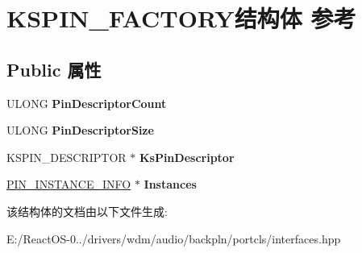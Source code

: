 \hypertarget{struct_k_s_p_i_n___f_a_c_t_o_r_y}{}\section{K\+S\+P\+I\+N\+\_\+\+F\+A\+C\+T\+O\+R\+Y结构体 参考}
\label{struct_k_s_p_i_n___f_a_c_t_o_r_y}
\subsection*{Public 属性}
\begin{DoxyCompactItemize}
\item 
\mbox{\label{struct_k_s_p_i_n___f_a_c_t_o_r_y_a96295da67a350f279e5c657413fafe99}} 
U\+L\+O\+NG {\bfseries Pin\+Descriptor\+Count}
\item 
\mbox{\label{struct_k_s_p_i_n___f_a_c_t_o_r_y_aec70f6dccde8f9519b9b0568a0471dfd}} 
U\+L\+O\+NG {\bfseries Pin\+Descriptor\+Size}
\item 
\mbox{\label{struct_k_s_p_i_n___f_a_c_t_o_r_y_a9c7919e031769a13818e985a945cdd34}} 
K\+S\+P\+I\+N\+\_\+\+D\+E\+S\+C\+R\+I\+P\+T\+OR $\ast$ {\bfseries Ks\+Pin\+Descriptor}
\item 
\mbox{\label{struct_k_s_p_i_n___f_a_c_t_o_r_y_a33d216198263af4b0ec750368335be93}} 
\hyperlink{struct_p_i_n___i_n_s_t_a_n_c_e___i_n_f_o}{P\+I\+N\+\_\+\+I\+N\+S\+T\+A\+N\+C\+E\+\_\+\+I\+N\+FO} $\ast$ {\bfseries Instances}
\end{DoxyCompactItemize}


该结构体的文档由以下文件生成\+:\begin{DoxyCompactItemize}
\item 
E\+:/\+React\+O\+S-\/0../drivers/wdm/audio/backpln/portcls/interfaces.\+hpp\end{DoxyCompactItemize}
